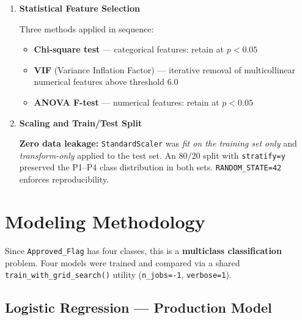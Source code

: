 \documentclass[12pt,a4paper]{article}
\begin{document}
\begin{enumerate}
  \item \textbf{Statistical Feature Selection}

  Three methods applied in sequence:
  \begin{itemize}
    \item \textbf{Chi-square test} --- categorical features: retain at $p < 0.05$
    \item \textbf{VIF} (Variance Inflation Factor) --- iterative removal of
          multicollinear numerical features above threshold 6.0
    \item \textbf{ANOVA F-test} --- numerical features: retain at $p < 0.05$
  \end{itemize}

  \item \textbf{Scaling and Train/Test Split}

  \begin{successbox}
    \textbf{Zero data leakage:} \texttt{StandardScaler} was \emph{fit on the
    training set only} and \emph{transform-only} applied to the test set.
    An 80/20 split with \texttt{stratify=y} preserved the P1--P4 class
    distribution in both sets. \texttt{RANDOM\_STATE=42} enforces reproducibility.
  \end{successbox}

\end{enumerate}

\newpage

\section{Modeling Methodology}

Since \texttt{Approved\_Flag} has four classes, this is a \textbf{multiclass
classification} problem. Four models were trained and compared via a shared
\texttt{train\_with\_grid\_search()} utility (\texttt{n\_jobs=-1}, \texttt{verbose=1}).

\subsection{Logistic Regression --- Production Model}
\end{document}
